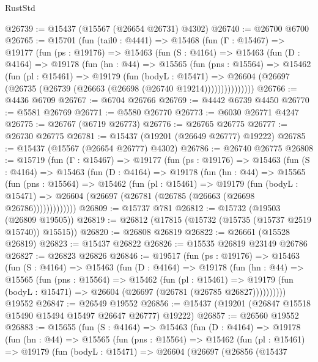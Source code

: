 \begin{lexlean}{RustStd}
\begin{coremodule}
@26739 := @15437 (@15567 (@26654 @26731) @4302)
@26740 := @26700 @6700
@26765 := @15701
    (fun (tail0 : @4441) =>
    @15468
      (fun (Γ : @15467) =>
      @19177
        (fun (ps : @19176) =>
        @15463
          (fun (S : @4164) =>
          @15463
            (fun (D : @4164) =>
            @19178
              (fun (hn : @44) =>
              @15565
                (fun (pns : @15564) =>
                @15462
                  (fun (pl : @15461) =>
                  @19179
                    (fun (bodyL : @15471) =>
                    @26604 (@26697 (@26735 (@26739 (@26663 (@26698 (@26740 @19214)))))))))))))))
@26766 := @4436 @6709
@26767 := @6704 @26766
@26769 := @4442 @6739 @4450
@26770 := @5581 @26769
@26771 := @5580 @26770
@26773 := @6030 @26771 @4247
@26775 := @26767 (@6719 @26773)
@26776 := @26765 @26775
@26777 := @26730 @26775
@26781 := @15437 (@19201 (@26649 @26777) @19222)
@26785 := @15437 (@15567 (@26654 @26777) @4302)
@26786 := @26740 @26775
@26808 := @15719
    (fun (Γ : @15467) =>
    @19177
      (fun (ps : @19176) =>
      @15463
        (fun (S : @4164) =>
        @15463
          (fun (D : @4164) =>
          @19178
            (fun (hn : @44) =>
            @15565
              (fun (pns : @15564) =>
              @15462
                (fun (pl : @15461) =>
                @19179
                  (fun (bodyL : @15471) =>
                  @26604 (@26697 (@26781 (@26785 (@26663 (@26698 @26786)))))))))))))
@26809 := @15737 @781
@26812 := @15732 (@19503 (@26809 @19505))
@26819 := @26812 (@17815 (@15732 (@15735 (@15737 @2519 @15740)) @15515))
@26820 := @26808 @26819
@26822 := @26661 (@15528 @26819)
@26823 := @15437 @26822
@26826 := @15535 @26819 @23149 @26786
@26827 := @26823 @26826
@26846 := @19517
    (fun (ps : @19176) =>
    @15463
      (fun (S : @4164) =>
      @15463
        (fun (D : @4164) =>
        @19178
          (fun (hn : @44) =>
          @15565
            (fun (pns : @15564) =>
            @15462
              (fun (pl : @15461) =>
              @19179 (fun (bodyL : @15471) => @26604 (@26697 (@26781 (@26785 @26827))))))))))
    @19552
@26847 := @26549 @19552
@26856 := @15437 (@19201 (@26847 @15518 @15490 @15494 @15497 @26647 @26777) @19222)
@26857 := @26560 @19552
@26883 := @15655
    (fun (S : @4164) =>
    @15463
      (fun (D : @4164) =>
      @19178
        (fun (hn : @44) =>
        @15565
          (fun (pns : @15564) =>
          @15462
            (fun (pl : @15461) =>
            @19179
              (fun (bodyL : @15471) =>
              @26604
                (@26697
                  (@26856
                    (@15437

\end{coremodule}
\end{lexlean}
